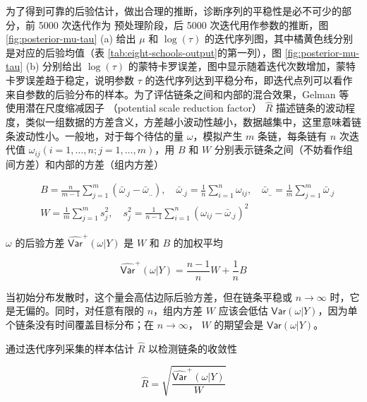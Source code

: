 \documentclass[12pt,a4paper,UTF8,twoside]{book}
\theoremstyle{definition}
\theoremstyle{definition}
\theoremstyle{definition}
\theoremstyle{remark}
\begin{document}
为了得到可靠的后验估计，做出合理的推断，诊断序列的平稳性是必不可少的部分，前 5000 次迭代作为 预处理阶段，后 5000 次迭代用作参数的推断，图 \ref{fig:posterior-mu-tau} (a) 给出 \(\mu\) 和 \(\log(\tau)\) 的迭代序列图，其中橘黄色线分别是对应的后验均值（表 \ref{tab:eight-schools-output}的第一列），图 \ref{fig:posterior-mu-tau} (b) 分别给出 \(\log(\tau)\) 的蒙特卡罗误差，图中显示随着迭代次数增加，蒙特卡罗误差趋于稳定，说明参数 \(\tau\) 的迭代序列达到平稳分布，即迭代点列可以看作来自参数的后验分布的样本。为了评估链条之间和内部的混合效果，Gelman 等 \citep{Gelman2013R} 使用潜在尺度缩减因子 （potential scale reduction factor） \(\hat{R}\) 描述链条的波动程度，类似一组数据的方差含义，方差越小波动性越小，数据越集中，这里意味着链条波动性小。一般地，对于每个待估的量 \(\omega\)，模拟产生 \(m\) 条链，每条链有 \(n\) 次迭代值 \(\omega_{ij} (i = 1,\ldots,n;j=1,\ldots,m)\)，用 \(B\) 和 \(W\) 分别表示链条之间（不妨看作组间方差）和内部的方差（组内方差）

\begin{equation}
\begin{aligned}
& B = \frac{n}{m-1}\sum_{j=1}^{m}(\bar{\omega}_{.j} - \bar{\omega}_{..} ), \quad \bar{\omega}_{.j} = \frac{1}{n}\sum_{i=1}^{n}\omega_{ij}, \quad \bar{\omega}_{..} = \frac{1}{m}\sum_{j=1}^{m} \bar{\omega}_{.j}\\
& W = \frac{1}{m}\sum_{j=1}^{m}s^{2}_{j}, \quad s^{2}_{j} = \frac{1}{n-1}\sum_{i=1}^{n}(\omega_{ij} - \bar{\omega}_{.j})^2
\end{aligned} \label{eq:potential-scale-reduction}
\end{equation}

\noindent \(\omega\) 的后验方差 \(\widehat{\mathsf{Var}}^{+}(\omega|Y)\) 是 \(W\) 和 \(B\) 的加权平均

\begin{equation}
\widehat{\mathsf{Var}}^{+}(\omega|Y) = \frac{n-1}{n} W + \frac{1}{n} B 
\end{equation}

当初始分布发散时，这个量会高估边际后验方差，但在链条平稳或 \(n \to \infty\) 时，它是无偏的。同时，对任意有限的 \(n\)，组内方差 \(W\) 应该会低估 \(\mathsf{Var}(\omega|Y)\)，因为单个链条没有时间覆盖目标分布；在 \(n \to \infty\)， \(W\) 的期望会是 \(\mathsf{Var}(\omega|Y)\)。

通过迭代序列采集的样本估计 \(\hat{R}\) 以检测链条的收敛性

\begin{equation}
\hat{R} = \sqrt{\frac{\widehat{\mathsf{Var}}^{+}(\omega|Y)}{W}}
\end{equation}
\end{document}
